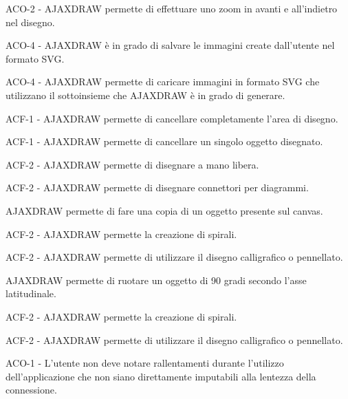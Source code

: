 \begin{elenconumerato}{\subsubsecindent}
\item{ACO-2 - AJAXDRAW permette di effettuare uno zoom in avanti e all'indietro nel disegno.}
\item{ACO-4 - AJAXDRAW \`e in grado di salvare le immagini create dall'utente nel formato SVG.}
\item{ACO-4 - AJAXDRAW permette di caricare immagini in formato SVG che utilizzano il sottoinsieme che AJAXDRAW \`e in grado di generare.}
\item{ACF-1 - AJAXDRAW permette di cancellare completamente l'area di disegno.}
\item{ACF-1 - AJAXDRAW permette di cancellare un singolo oggetto disegnato.}
\end{elenconumerato}

\begin{elenconumerato}{\subsubsecindent}
\item{ACF-2 - AJAXDRAW permette di disegnare a mano libera.}
\item{ACF-2 - AJAXDRAW permette di disegnare connettori per diagrammi.}
\item{ AJAXDRAW permette di fare una copia di un oggetto presente sul canvas.}
\end{elenconumerato}

\begin{elenconumerato}{\subsubsecindent}
\item{ACF-2 - AJAXDRAW permette la creazione di spirali.}
\item{ACF-2 - AJAXDRAW permette di utilizzare il disegno calligrafico o pennellato.}
\item{ AJAXDRAW permette di ruotare un oggetto di 90 gradi secondo l'asse latitudinale.}
\end{elenconumerato}

\begin{elenconumerato}{\subsubsecindent}
\item{ACF-2 - AJAXDRAW permette la creazione di spirali.}
\item{ACF-2 - AJAXDRAW permette di utilizzare il disegno calligrafico o pennellato.}
\end{elenconumerato}

\begin{elenconumerato}{\subsubsecindent}
\item ACO-1 - L'utente non deve notare rallentamenti durante l'utilizzo dell'applicazione che non siano direttamente imputabili alla lentezza della connessione.
\end{elenconumerato}


